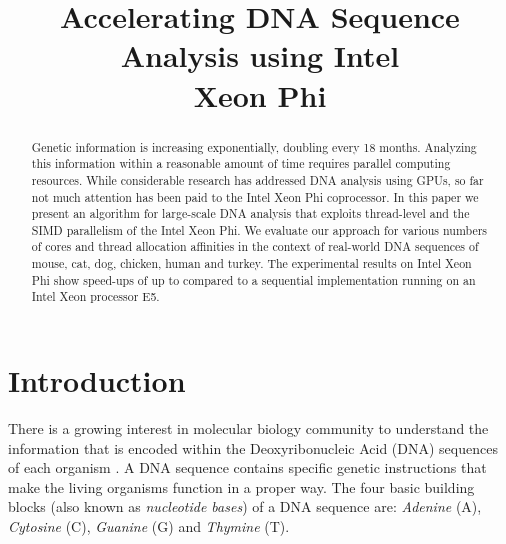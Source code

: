 \documentclass[conference]{IEEEtran}
\begin{document}
\title{Accelerating DNA Sequence Analysis using Intel\textsuperscript{\textregistered} \\Xeon Phi\texttrademark}

\author{
}


\maketitle


\begin{abstract}
Genetic information is increasing exponentially, doubling every 18 months. Analyzing this information within a reasonable amount of time requires parallel computing resources. While considerable research has addressed DNA analysis using GPUs, so far not much attention has been paid to the Intel Xeon Phi coprocessor. In this paper we present an algorithm for large-scale DNA analysis that exploits thread-level and the SIMD parallelism of the Intel Xeon Phi. We evaluate our approach for various numbers of cores and thread allocation affinities in the context of real-world DNA sequences of mouse, cat, dog, chicken, human and turkey. The experimental results on Intel Xeon Phi show speed-ups of up to  compared to a sequential implementation running on an Intel Xeon processor E5.
\end{abstract}


\IEEEpeerreviewmaketitle


\section{Introduction} \label{introduction}


There is a growing interest in molecular biology community to understand the information that is encoded within the Deoxyribonucleic Acid (DNA) sequences of each organism \cite{Editorial}. A DNA sequence contains specific genetic instructions that make the living organisms function in a proper way. The four basic building blocks (also known as \emph{nucleotide bases}) of a DNA sequence are: \emph{Adenine} (A), \emph{Cytosine} (C), \emph{Guanine} (G) and \emph{Thymine} (T). 
\end{document}
